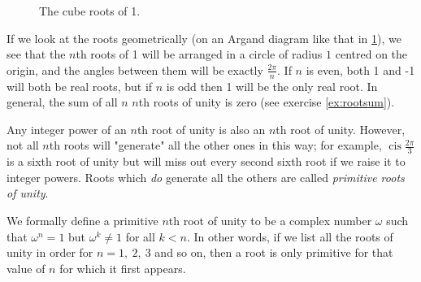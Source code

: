 \documentclass[a4paper,10pt,titlepage]{article}
\theoremstyle{definition}
\DeclareMathOperator{\cis}{cis}
\newcommand*\realp[1]{ \mathfrak{Re} \left ( {#1} \right )  }
\newcommand*\imagp[1]{ \mathfrak{Im} \left ( {#1} \right )  }
\begin{document}
\begin{figure}
  \centering
  \caption{The cube roots of 1.\label{fig:cuberoots}}
\end{figure}

If we look at the roots geometrically (on an Argand diagram like that in \cref{fig:cuberoots}), we see that
the $ n$th roots of 1 will be arranged in a circle of radius $ 1 $ centred on the origin, and the
angles between them will be exactly $ \frac{2\pi}{n} $. If $ n $ is even, both 1 and -1 will both
be real roots, but if $ n $ is odd then 1 will be the only real root. In general, the sum of all
$ n $ $n$th roots of unity is zero (see exercise \ref{ex:rootsum}).

Any integer power of an $n$th root of unity is also an $n$th root of unity. However, not
all $ n$th roots will "generate" all the other ones in this way; for example, $ \cis \frac{2\pi}{3} $
is a sixth root of unity but will miss out every second sixth root if we raise it to integer
powers. Roots which \emph{do} generate all the others are called \emph{primitive roots of unity}.

We formally define a primitive $n$th root of unity to be a complex number $ \omega $ such that $ \omega^n = 1$
but $ \omega^k \neq 1 $ for all $ k < n $. In other words, if we list all the roots of unity in order for $ n = 1,~2,~3 $
and so on, then a root is only primitive for that value of $ n $ for which it first appears.
\end{document}
